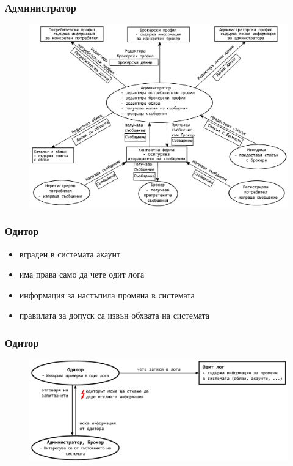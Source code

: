\documentclass[12pt]{beamer}
\begin{document}
\begin{frame}[fragile]
\frametitle{Администратор}
	\begin{figure}[h]
	\centering
	\includegraphics[scale=0.50]{flow-administrator}
	\end{figure}
\end{frame}

\begin{frame}[fragile]
\frametitle{Одитор}
		\begin{itemize}
		\item вграден в системата акаунт
		\item има права само да чете одит лога
		\item информация за настъпила промяна в системата
		\item правилата за допуск са извън обхвата на системата
		\end{itemize}
\end{frame}

\begin{frame}[fragile]
\frametitle{Одитор}
	\begin{figure}[h]
	\centering
	\includegraphics[scale=0.70]{flow-auditor-small}
	\end{figure}
\end{frame}
\end{document}
